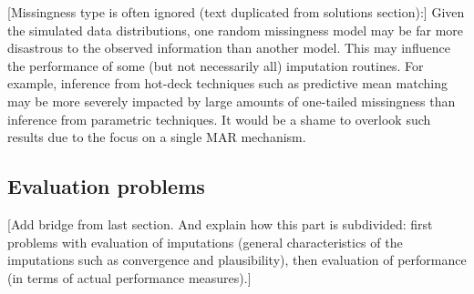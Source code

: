 \documentclass[bimj,fleqn]{w-art}
\begin{document}
[Missingness type is often ignored (text duplicated from solutions section):] Given the simulated data distributions, one random missingness model may be far more disastrous to the observed information than another model. This may influence the performance of some (but not necessarily all) imputation routines. For example, inference from hot-deck techniques such as predictive mean matching \citep{little1988missing, rubin1986statistical} may be more severely impacted by large amounts of one-tailed missingness than inference from parametric techniques. It would be a shame to overlook such results due to the focus on a single MAR mechanism.



\subsection{Evaluation problems}



[Add bridge from last section. And explain how this part is subdivided: first problems with evaluation of imputations (general characteristics of the imputations such as convergence and plausibility), then evaluation of performance (in terms of actual performance measures).]
\end{document}
